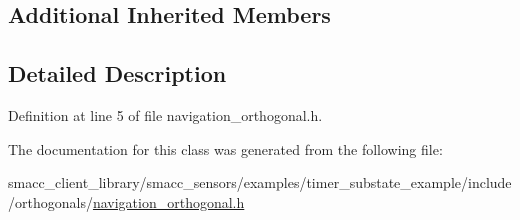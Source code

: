 \subsection*{Additional Inherited Members}


\subsection{Detailed Description}


Definition at line 5 of file navigation\+\_\+orthogonal.\+h.



The documentation for this class was generated from the following file\+:\begin{DoxyCompactItemize}
\item 
smacc\+\_\+client\+\_\+library/smacc\+\_\+sensors/examples/timer\+\_\+substate\+\_\+example/include/orthogonals/\hyperlink{smacc__client__library_2smacc__sensors_2examples_2timer__substate__example_2include_2orthogonals_2navigation__orthogonal_8h}{navigation\+\_\+orthogonal.\+h}\end{DoxyCompactItemize}
